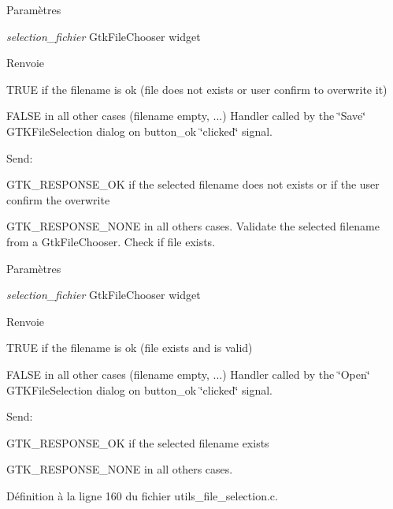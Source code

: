\begin{DoxyParams}{Paramètres}
\item[{\em selection\_\-fichier}]GtkFileChooser widget \end{DoxyParams}
\begin{DoxyReturn}{Renvoie}

\begin{DoxyItemize}
\item TRUE if the filename is ok (file does not exists or user confirm to overwrite it)
\item FALSE in all other cases (filename empty, ...) Handler called by the \char`\"{}Save\char`\"{} GTKFileSelection dialog on button\_\-ok \char`\"{}clicked\char`\"{} signal.
\end{DoxyItemize}
\end{DoxyReturn}
Send:
\begin{DoxyItemize}
\item GTK\_\-RESPONSE\_\-OK if the selected filename does not exists or if the user confirm the overwrite
\item GTK\_\-RESPONSE\_\-NONE in all others cases. Validate the selected filename from a GtkFileChooser. Check if file exists.
\end{DoxyItemize}


\begin{DoxyParams}{Paramètres}
\item[{\em selection\_\-fichier}]GtkFileChooser widget \end{DoxyParams}
\begin{DoxyReturn}{Renvoie}

\begin{DoxyItemize}
\item TRUE if the filename is ok (file exists and is valid)
\item FALSE in all other cases (filename empty, ...) Handler called by the \char`\"{}Open\char`\"{} GTKFileSelection dialog on button\_\-ok \char`\"{}clicked\char`\"{} signal.
\end{DoxyItemize}
\end{DoxyReturn}
Send:
\begin{DoxyItemize}
\item GTK\_\-RESPONSE\_\-OK if the selected filename exists
\item GTK\_\-RESPONSE\_\-NONE in all others cases. 
\end{DoxyItemize}

Définition à la ligne 160 du fichier utils\_\-file\_\-selection.c.

